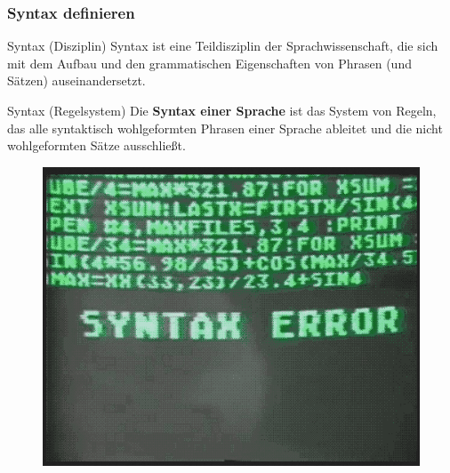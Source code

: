 \begin{frame}
\frametitle{Syntax definieren}

\begin{block}{Syntax (Disziplin)}
Syntax ist eine Teildisziplin der Sprachwissenschaft, die sich mit dem Aufbau und den grammatischen Eigenschaften von Phrasen (und Sätzen) auseinandersetzt.
\end{block}

\begin{block}{Syntax (Regelsystem)}
Die \textbf{Syntax einer Sprache} ist das System von Regeln, das alle syntaktisch wohlgeformten Phrasen einer Sprache ableitet und die nicht wohlgeformten Sätze ausschließt.
\end{block}

\end{frame}


\begin{frame}

\begin{figure}
\centering
	\includegraphics[scale=.7]{material/02syntaxerror}
\end{figure}

\end{frame}


